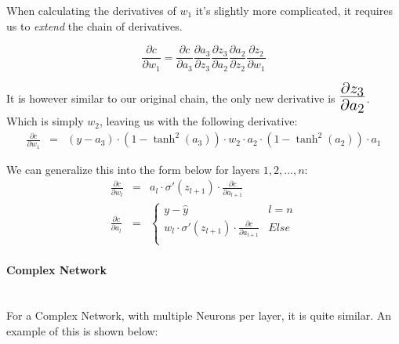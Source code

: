 \begin{flushleft}
                    \vspace{0.2cm}

                    When calculating the derivatives of $w_1$ it's slightly more complicated, it requires us to \textit{extend}
                    the chain of derivatives.

                    \[\frac{\partial c}{\partial w_1} = \frac{\partial c}{\partial a_3} \frac{\partial a_3}{\partial z_3} \frac{\partial z_3}{\partial a_2} \frac{\partial a_2}{\partial z_2} \frac{\partial z_2}{\partial w_1}\]

                    It is however similar to our original chain, the only new derivative is $\mathLarge{\frac{\partial z_3}{\partial a_2}}$.
                    Which is simply $w_2$, leaving us with the following derivative:
                    \begin{eqnarray*}
                        \frac{\partial c}{\partial w_{1}} &=& (y - a_3) \cdot (1 - \tanh^{2}(a_3)) \cdot w_2 \cdot a_2 \cdot (1 - \tanh^{2}(a_2)) \cdot a_1
                    \end{eqnarray*}

                    We can generalize this into the form below for layers $1,2, \hdots, n$:
                    \begin{eqnarray*}
                        \frac{\partial c}{\partial w_{l}} &=& a_l \cdot \sigma'(z_{l+1}) \cdot \frac{\partial c}{\partial a_{l+1}} \\
                        \frac{\partial c}{\partial a_{l}} &=&
                        \begin{cases}
                            y - \hat{y} & l = n \\
                            w_l \cdot \sigma'(z_{l+1}) \cdot \frac{\partial c}{\partial a_{l+1}} & Else \\
                        \end{cases} 
                    \end{eqnarray*}

                \paragraph{Complex Network} \mbox{} \\ 
                    For a Complex Network, with multiple Neurons per layer, it is quite similar. An example of this is shown below: \\


\end{flushleft}
